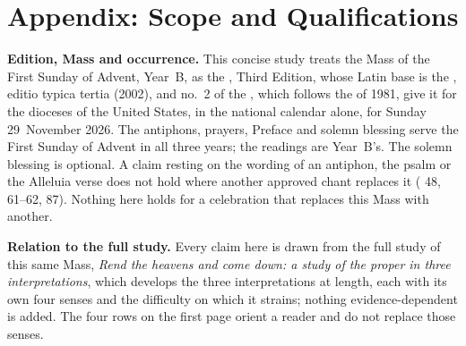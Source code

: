 
\section{Appendix: Scope and Qualifications}

{\footnotesize
\textbf{Edition, Mass and occurrence.} This concise study treats the Mass of
the First Sunday of Advent, Year~B, as the , Third Edition,
whose Latin base is the , editio typica tertia (2002),
and no.~2 of the , which follows the  of
1981, give it for the dioceses of the United States, in the national calendar
alone, for Sunday 29~November 2026. The antiphons, prayers, Preface and solemn
blessing serve the First Sunday of Advent in all three years; the readings are
Year~B's. The solemn blessing is optional. A claim resting on the wording of
an antiphon, the psalm or the Alleluia verse does not hold where another
approved chant replaces it ( 48, 61--62, 87).
Nothing here holds for a celebration that replaces this Mass with another.

\textbf{Relation to the full study.} Every claim here is drawn from the full
study of this same Mass, \textit{Rend the heavens and come down: a study of the
proper in three interpretations}, which develops the three interpretations at
length, each with its own four senses and the difficulty on which it strains;
nothing evidence-dependent is added. The four rows on the first page orient a
reader and do not replace those senses.

}
